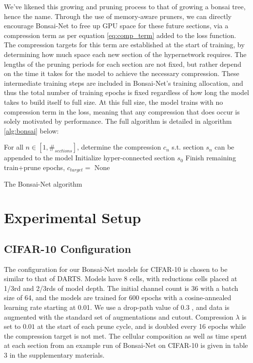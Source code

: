 \documentclass[10pt,twocolumn,letterpaper]{article}
\begin{document}
We've likened this growing and pruning process to that of growing a bonsai tree, hence the name. Through the use of memory-aware pruners, we can directly encourage Bonsai-Net to free up GPU space for these future sections, via a compression term as per equation \ref{eq:comp_term} added to the loss function. The compression targets for this term are established at the start of training, by determining how much space each new section of the hypernetwork requires. The lengths of the pruning periods for each section are not fixed, but rather depend on the time it takes for the model to achieve the necessary compression. These intermediate training steps are included in Bonsai-Net's training allocation, and thus the total number of training epochs is fixed regardless of how long the model takes to build itself to full size. At this full size, the model trains with no compression term in the loss, meaning that any compression that does occur is solely motivated by performance. The full algorithm is detailed in algorithm \ref{alg:bonsai} below:
\begin{algorithm}
\SetAlgoLined
For all $n \in [1, \#_{sections}]$, determine the compression $c_n$ s.t. section $s_n$ can be appended to the model\;
Initialize hyper-connected section $s_0$\;
\BlankLine
{}
Finish remaining train+prune epochs, $c_{target}= $ None\;
\caption{The Bonsai-Net algorithm}
\label{alg:bonsai}
\end{algorithm}
\section{Experimental Setup}
\subsection{CIFAR-10 Configuration}
The configuration for our Bonsai-Net models for CIFAR-10 is chosen to be similar to that of DARTS. Models have 8 cells, with reductions cells placed at 1/3rd and 2/3rds of model depth. The initial channel count is 36 with a batch size of 64, and the models are trained for 600 epochs with a cosine-annealed learning rate starting at 0.01. We use a drop-path value of 0.3 \cite{larsson2016}, and data is augmented with the standard set of augmentations and cutout. Compression $\lambda$ is set to $0.01$ at the start of each prune cycle, and is doubled every 16 epochs while the compression target is not met. The cellular composition as well as time spent at each section from an example run of Bonsai-Net on CIFAR-10 is given in table 3 in the supplementary materials.
\end{document}
